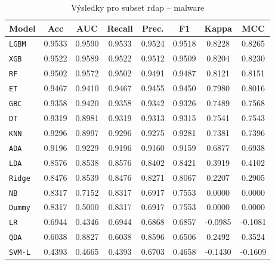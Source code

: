 \begin{table}[H]
  \centering
  \small
  \caption{Výsledky pro subset rdap – malware}
  \begin{tabular}{|l|c|c|c|c|c|c|c|}
    \hline
    \textbf{Model} & \textbf{Acc} & \textbf{AUC} & \textbf{Recall} & \textbf{Prec.} & \textbf{F1} & \textbf{Kappa} & \textbf{MCC} \\
    \hline
    \texttt{LGBM} & 0.9533 & 0.9590 & 0.9533 & 0.9524 & 0.9518 & 0.8228 & 0.8265 \\
    \texttt{XGB} & 0.9522 & 0.9589 & 0.9522 & 0.9512 & 0.9509 & 0.8204 & 0.8230 \\
    \texttt{RF} & 0.9502 & 0.9572 & 0.9502 & 0.9491 & 0.9487 & 0.8121 & 0.8151 \\
    \texttt{ET} & 0.9467 & 0.9410 & 0.9467 & 0.9455 & 0.9450 & 0.7980 & 0.8016 \\
    \texttt{GBC} & 0.9358 & 0.9420 & 0.9358 & 0.9342 & 0.9326 & 0.7489 & 0.7568 \\
    \texttt{DT} & 0.9319 & 0.8981 & 0.9319 & 0.9313 & 0.9315 & 0.7541 & 0.7543 \\
    \texttt{KNN} & 0.9296 & 0.8997 & 0.9296 & 0.9275 & 0.9281 & 0.7381 & 0.7396 \\
    \texttt{ADA} & 0.9196 & 0.9229 & 0.9196 & 0.9160 & 0.9159 & 0.6877 & 0.6938 \\
    \texttt{LDA} & 0.8576 & 0.8538 & 0.8576 & 0.8402 & 0.8421 & 0.3919 & 0.4102 \\
    \texttt{Ridge} & 0.8476 & 0.8539 & 0.8476 & 0.8271 & 0.8067 & 0.2207 & 0.2905 \\
    \texttt{NB} & 0.8317 & 0.7152 & 0.8317 & 0.6917 & 0.7553 & 0.0000 & 0.0000 \\
    \texttt{Dummy} & 0.8317 & 0.5000 & 0.8317 & 0.6917 & 0.7553 & 0.0000 & 0.0000 \\
    \texttt{LR} & 0.6944 & 0.4346 & 0.6944 & 0.6868 & 0.6857 & -0.0985 & -0.1081 \\
    \texttt{QDA} & 0.6038 & 0.8827 & 0.6038 & 0.8596 & 0.6506 & 0.2492 & 0.3524 \\
    \texttt{SVM-L} & 0.4393 & 0.4665 & 0.4393 & 0.6703 & 0.4658 & -0.1430 & -0.1609 \\
    \hline
  \end{tabular}
\end{table}
\vspace{0.5cm}

